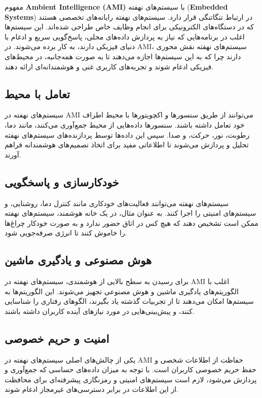 مفهوم \textbf{Ambient Intelligence (AMI)} با سیستم‌های نهفته (\textbf{Embedded Systems}) در ارتباط تنگاتنگی قرار دارد. سیستم‌های نهفته رایانه‌های تخصصی هستند که در دستگاه‌های الکترونیکی برای انجام وظایف خاص طراحی شده‌اند. این سیستم‌ها اغلب در برنامه‌هایی که نیاز به پردازش داده‌های محلی، پاسخ‌گویی سریع و ادغام با دنیای فیزیکی دارند، به کار برده می‌شوند. در AMI، سیستم‌های نهفته نقش محوری دارند چرا که به این سیستم‌ها اجازه می‌دهند تا به صورت همه‌جانبه، در محیط‌های فیزیکی ادغام شوند و تجربه‌های کاربری غنی و هوشمندانه‌ای ارائه دهند.



\subsection*{تعامل با محیط}
سیستم‌های نهفته در AMI می‌توانند از طریق سنسورها و اکچویتورها با محیط اطراف خود تعامل داشته باشند. سنسورها داده‌هایی از محیط جمع‌آوری می‌کنند، مانند دما، رطوبت، نور، حرکت، و صدا. سپس این داده‌ها توسط پردازنده‌های سیستم‌های نهفته تحلیل و پردازش می‌شوند تا اطلاعاتی مفید برای اتخاذ تصمیم‌های هوشمندانه فراهم آورند.

\subsection*{خودکارسازی و پاسخگویی}
سیستم‌های نهفته می‌توانند فعالیت‌های خودکاری مانند کنترل دما، روشنایی، و سیستم‌های امنیتی را اجرا کنند. به عنوان مثال، در یک خانه هوشمند، سیستم‌های نهفته ممکن است تشخیص دهند که هیچ کس در اتاق حضور ندارد و به صورت خودکار چراغ‌ها را خاموش کنند تا انرژی صرفه‌جویی شود.

\subsection*{هوش مصنوعی و یادگیری ماشین}
برای رسیدن به سطح بالایی از هوشمندی، سیستم‌های نهفته در AMI اغلب با الگوریتم‌های یادگیری ماشین و هوش مصنوعی تجهیز می‌شوند. این الگوریتم‌ها به سیستم‌ها امکان می‌دهند تا از تجربیات گذشته یاد بگیرند، الگوهای رفتاری را شناسایی کنند، و پیش‌بینی‌هایی در مورد نیازهای آینده کاربران داشته باشند.

\subsection*{امنیت و حریم خصوصی}
یکی از چالش‌های اصلی سیستم‌های نهفته در AMI حفاظت از اطلاعات شخصی و حفظ حریم خصوصی کاربران است. با توجه به میزان داده‌های حساسی که جمع‌آوری و پردازش می‌شود، لازم است سیستم‌های امنیتی و رمزنگاری پیشرفته‌ای برای محافظت از این اطلاعات در برابر دسترسی‌های غیرمجاز ادغام شوند.

